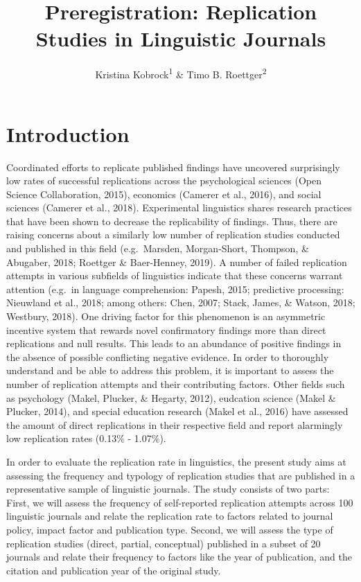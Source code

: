 \documentclass[
  english,
  man]{apa6}
\title{Preregistration: Replication Studies in Linguistic Journals}
\author{Kristina Kobrock\textsuperscript{1} \& Timo B. Roettger\textsuperscript{2}}
\date{}
\affiliation{\vspace{0.5cm}\textsuperscript{1} University of Osnabrück\\\textsuperscript{2} University of Oslo}
\begin{document}
\maketitle

\hypertarget{introduction}{%
\section{Introduction}\label{introduction}}

Coordinated efforts to replicate published findings have uncovered surprisingly low rates of successful replications across the psychological sciences (Open Science Collaboration, 2015), economics (Camerer et al., 2016), and social sciences (Camerer et al., 2018).
Experimental linguistics shares research practices that have been shown to decrease the replicability of findings. Thus, there are raising concerns about a similarly low number of replication studies conducted and published in this field (e.g.~Marsden, Morgan‐Short, Thompson, \& Abugaber, 2018; Roettger \& Baer-Henney, 2019).
A number of failed replication attempts in various subfields of linguistics indicate that these concerns warrant attention (e.g.~in language comprehension: Papesh, 2015; predictive processing: Nieuwland et al., 2018; among others: Chen, 2007; Stack, James, \& Watson, 2018; Westbury, 2018).
One driving factor for this phenomenon is an asymmetric incentive system that rewards novel confirmatory findings more than direct replications and null results.
This leads to an abundance of positive findings in the absence of possible conflicting negative evidence.
In order to thoroughly understand and be able to address this problem, it is important to assess the number of replication attempts and their contributing factors.
Other fields such as psychology (Makel, Plucker, \& Hegarty, 2012), eudcation science (Makel \& Plucker, 2014), and special education research (Makel et al., 2016) have assessed the amount of direct replications in their respective field and report alarmingly low replication rates (0.13\% - 1.07\%).

In order to evaluate the replication rate in linguistics, the present study aims at assessing the frequency and typology of replication studies that are published in a representative sample of linguistic journals.
The study consists of two parts:
First, we will assess the frequency of self-reported replication attempts across 100 linguistic journals and relate the replication rate to factors related to journal policy, impact factor and publication type.
Second, we will assess the type of replication studies (direct, partial, conceptual) published in a subset of 20 journals and relate their frequency to factors like the year of publication, and the citation and publication year of the original study.
\end{document}
